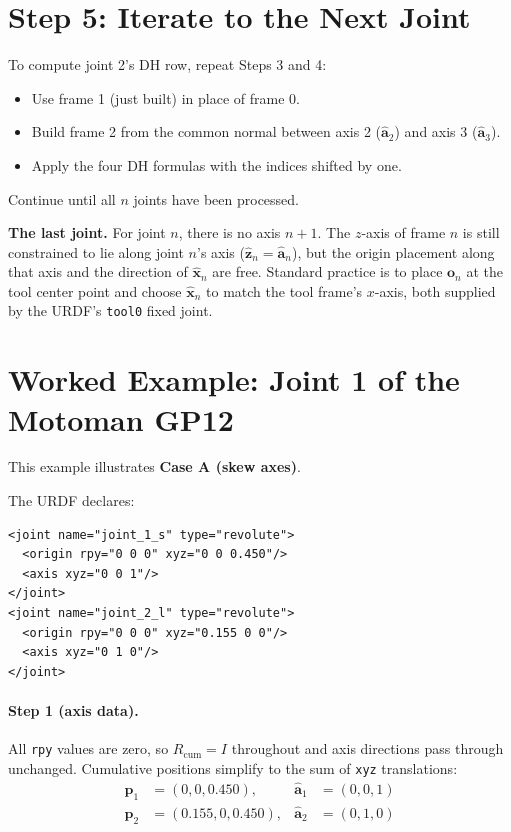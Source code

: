\documentclass[11pt]{article}
\newcommand{\vect}[1]{\bm{#1}}
\newcommand{\unit}[1]{\hat{\bm{#1}}}
\begin{document}
\section{Step 5: Iterate to the Next Joint}

To compute joint 2's DH row, repeat Steps 3 and 4:
\begin{itemize}
  \item Use frame 1 (just built) in place of frame 0.
  \item Build frame 2 from the common normal between axis 2 ($\unit{a}_2$)
        and axis 3 ($\unit{a}_3$).
  \item Apply the four DH formulas with the indices shifted by one.
\end{itemize}
Continue until all $n$ joints have been processed.

\begin{warnbox}
\textbf{The last joint.} For joint $n$, there is no axis $n{+}1$. The
$z$-axis of frame $n$ is still constrained to lie along joint $n$'s axis
($\unit{z}_n = \unit{a}_n$), but the origin placement along that axis and
the direction of $\unit{x}_n$ are free. Standard practice is to place
$\vect{o}_n$ at the tool center point and choose $\unit{x}_n$ to match the
tool frame's $x$-axis, both supplied by the URDF's \texttt{tool0} fixed
joint.
\end{warnbox}

\section{Worked Example: Joint 1 of the Motoman GP12}

This example illustrates \textbf{Case A (skew axes)}.

The URDF declares:
\begin{verbatim}
<joint name="joint_1_s" type="revolute">
  <origin rpy="0 0 0" xyz="0 0 0.450"/>
  <axis xyz="0 0 1"/>
</joint>
<joint name="joint_2_l" type="revolute">
  <origin rpy="0 0 0" xyz="0.155 0 0"/>
  <axis xyz="0 1 0"/>
</joint>
\end{verbatim}

\paragraph{Step 1 (axis data).} All \texttt{rpy} values are zero, so
$R_{\mathrm{cum}} = I$ throughout and axis directions pass through unchanged.
Cumulative positions simplify to the sum of \texttt{xyz} translations:
\begin{align*}
  \vect{p}_1 &= (0, 0, 0.450), & \unit{a}_1 &= (0, 0, 1) \\
  \vect{p}_2 &= (0.155, 0, 0.450), & \unit{a}_2 &= (0, 1, 0)
\end{align*}
\end{document}
